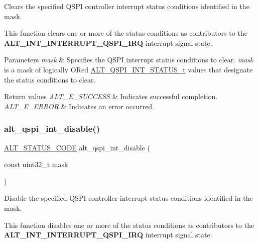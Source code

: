 Clears the specified Q\+S\+PI controller interrupt status conditions identified in the mask.

This function clears one or more of the status conditions as contributors to the {\bfseries{A\+L\+T\+\_\+\+I\+N\+T\+\_\+\+I\+N\+T\+E\+R\+R\+U\+P\+T\+\_\+\+Q\+S\+P\+I\+\_\+\+I\+RQ}} interrupt signal state.


\begin{DoxyParams}{Parameters}
{\em mask} & Specifies the Q\+S\+PI interrupt status conditions to clear. {\itshape mask} is a mask of logically OR\textquotesingle{}ed \mbox{\hyperlink{group__ALT__QSPI__CSR_ga9630d0374a96983752d4053c122665dd}{A\+L\+T\+\_\+\+Q\+S\+P\+I\+\_\+\+I\+N\+T\+\_\+\+S\+T\+A\+T\+U\+S\+\_\+t}} values that designate the status conditions to clear.\\
\hline
\end{DoxyParams}

\begin{DoxyRetVals}{Return values}
{\em A\+L\+T\+\_\+\+E\+\_\+\+S\+U\+C\+C\+E\+SS} & Indicates successful completion. \\
\hline
{\em A\+L\+T\+\_\+\+E\+\_\+\+E\+R\+R\+OR} & Indicates an error occurred. \\
\hline
\end{DoxyRetVals}
\mbox{\label{group__ALT__QSPI__CSR_gabafd6da28abc48578f144cbd6c85e224}} 
\subsubsection{\texorpdfstring{alt\_qspi\_int\_disable()}{alt\_qspi\_int\_disable()}}
{\footnotesize\ttfamily \mbox{\hyperlink{hwlib_8h_abdb0d369f069723ca55d6c94bcaaaa12}{A\+L\+T\+\_\+\+S\+T\+A\+T\+U\+S\+\_\+\+C\+O\+DE}} alt\+\_\+qspi\+\_\+int\+\_\+disable (\begin{DoxyParamCaption}\item[{const uint32\+\_\+t}]{mask }\end{DoxyParamCaption})}

Disable the specified Q\+S\+PI controller interrupt status conditions identified in the mask.

This function disables one or more of the status conditions as contributors to the {\bfseries{A\+L\+T\+\_\+\+I\+N\+T\+\_\+\+I\+N\+T\+E\+R\+R\+U\+P\+T\+\_\+\+Q\+S\+P\+I\+\_\+\+I\+RQ}} interrupt signal state.

